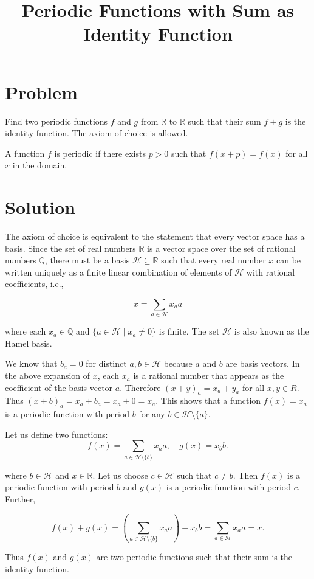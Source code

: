 
\title{Periodic Functions with Sum as Identity Function}

\section*{Problem}
Find two periodic functions \( f \) and \( g \) from \( \mathbb{R} \)
to \( \mathbb{R} \) such that their sum \( f + g \) is the identity
function. The axiom of choice is allowed.

A function \( f \) is periodic if there exists \( p > 0 \) such that
\( f(x + p) = f(x) \) for all \( x \) in the domain.

\section*{Solution}
The axiom of choice is equivalent to the statement that every vector
space has a basis. Since the set of real numbers \( \mathbb{R} \) is a
vector space over the set of rational numbers \( \mathbb{Q} \), there
must be a basis \( \mathcal{H} \subseteq \mathbb{R} \) such that every
real number \( x \) can be written uniquely as a finite linear
combination of elements of \( \mathcal{H} \) with rational coefficients,
i.e.,

\[
    x = \sum_{a \in \mathcal{H}} x_a a
\]

where each \( x_a \in \mathbb{Q} \) and \( \{ a \in \mathcal{H} \mid x_a
\ne 0 \} \) is finite. The set \( \mathcal{H} \) is also known as the
Hamel basis.

We know that \( b_a = 0 \) for distinct \( a, b \in \mathcal{H} \)
because \( a \) and \( b \) are basis vectors. In the above expansion of
\( x \), each \( x_a \) is a rational number that appears as the
coefficient of the basis vector \( a \). Therefore \( (x + y)_{a} = x_a
+ y_a \) for all \( x, y \in R \). Thus \( (x + b)_{a} = x_a + b_a = x_a
+ 0 = x_a \). This shows that a function \( f(x) = x_a \) is a periodic
function with period \( b \) for any \( b \in \mathcal{H} \setminus
\{a\} \).

Let us define two functions:
\[
    f(x) = \sum_{a \in \mathcal{H} \setminus \{ b \}} x_a a,
    \hspace{1em}
    g(x) = x_b b.
\]

where \( b \in \mathcal{H} \) and \( x \in \mathbb{R} \). Let us
choose \( c \in \mathcal{H} \) such that \( c \ne b \). Then \( f(x) \)
is a periodic function with period \( b \) and \( g(x) \) is a periodic
function with period \( c \). Further,

\[
f(x) + g(x)
= \left( \sum_{a \in \mathcal{H} \setminus \{ b \}} x_a a \right) + x_b b
= \sum_{a \in \mathcal{H}} x_a a
= x.
\]

Thus \( f(x) \) and \( g(x) \) are two periodic functions such that
their sum is the identity function.

\nocite{pfml-periodic-functions}
\nocite{radcliffe-periodic-functions}
\nocite{youcis-dim-r-q}

